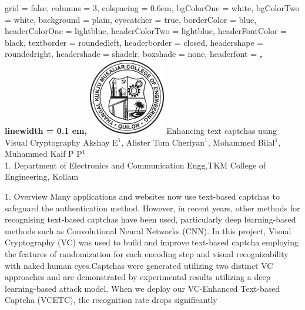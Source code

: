 \documentclass[
    landscape,      %
    paperwidth = 1120mm,
    paperheight = 950mm,
    fontscale = 0.30,
    margin = 1.7cm,
]{baposter}
\begin{document}
\begin{poster}{
    grid = false,            %
    columns = 3,
    colspacing = 0.6em,
    bgColorOne = white,
    bgColorTwo = white,
    background = plain,     %
    eyecatcher = true,      %
    borderColor = blue,
    headerColorOne = lightblue,
    headerColorTwo = lightblue,
    headerFontColor = black,
    textborder = roundedleft,   %
    headerborder = closed,      %
    headershape = roundedright, %
    headershade = shadelr,      %
    boxshade = none,            %
    headerfont = \Large\bf\textsc,
    linewidth = 0.1 em,}
{\includegraphics[height=9em]{./images/tkm-logo.png}}
{\Huge{Enhancing text captchas using Visual Cryptography}}
{
    \vspace{0.3em}
    Akshay E$^1$,
    Alister Tom Cheriyan$^1$,
    Mohammed Bilal$^1$,
    Muhammed Kaif P P$^1$ \\
    \vspace{0.3em}
    1. Department of Electronics and Communication Engg,TKM College of Engineering, Kollam \\
}

\vspace{0.4cm}

\begin{posterbox}[column=0, row=0]{1. Overview}
\setlength{\parskip}{3pt}
Many applications and websites now use text-based captchas to safeguard the authentication method. However, in recent years, other methods for recognising text-based captchas have been used, particularly deep learning-based methods such as Convolutional Neural Networks (CNN). 
\hspace{0.1cm}
In this project, Visual Cryptography (VC) was used to build and improve text-based captcha employing the features of randomization for each encoding step and visual recognizability with naked human eyes.Captchas were generated utilizing two distinct VC approaches and are demonstrated by experimental results utilizing a deep learning-based attack model. When we deploy our VC-Enhanced Text-based Captcha (VCETC), the recognition rate drops significantly
\end{posterbox}


\end{poster}
\end{document}
